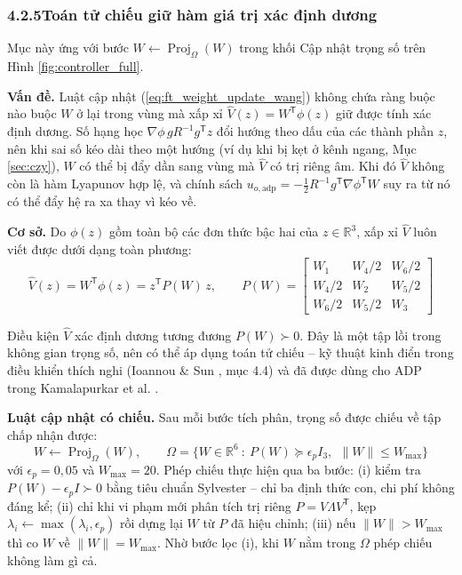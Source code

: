 \documentclass[12pt,a4paper]{article}
\makeatletter
\newcommand{\seclabel}[2]{\phantomsection\protected@edef\@currentlabel{#2}\label{#1}}
\newcommand{\R}{\mathbb{R}}
\newcommand{\T}{\mathsf{T}}
\makeatother
\begin{document}
\subsubsection*{4.2.5\quad Toán tử chiếu giữ hàm giá trị xác định dương}
\seclabel{sec:projection}{4.2.5}

Mục này ứng với bước $W \leftarrow \operatorname{Proj}_\Omega(W)$ trong khối Cập nhật trọng số trên Hình \ref{fig:controller_full}.

\textbf{Vấn đề.} Luật cập nhật (\ref{eq:ft_weight_update_wang}) không chứa ràng buộc nào buộc $W$ ở lại trong vùng mà xấp xỉ $\hat{V}(z) = W^\T\phi(z)$ giữ được tính xác định dương. Số hạng học $\nabla\phi\, g R^{-1} g^\T z$ đổi hướng theo dấu của các thành phần $z$, nên khi sai số kéo dài theo một hướng (ví dụ khi bị kẹt ở kênh ngang, Mục \ref{sec:czy}), $W$ có thể bị đẩy dần sang vùng mà $\hat V$ có trị riêng âm. Khi đó $\hat{V}$ không còn là hàm Lyapunov hợp lệ, và chính sách $u_{o,\text{adp}} = -\frac{1}{2}R^{-1}g^\T\nabla\phi^\T W$ suy ra từ nó có thể đẩy hệ ra xa thay vì kéo về.

\textbf{Cơ sở.} Do $\phi(z)$ gồm toàn bộ các đơn thức bậc hai của $z \in \R^3$, xấp xỉ $\hat V$ luôn viết được dưới dạng toàn phương:
\begin{equation}\label{eq:V_quadratic}
    \hat{V}(z) = W^\T\phi(z) = z^\T P(W)\, z, \qquad
    P(W) = \begin{bmatrix}
        W_1 & W_4/2 & W_6/2 \\
        W_4/2 & W_2 & W_5/2 \\
        W_6/2 & W_5/2 & W_3
    \end{bmatrix}
\end{equation}

Điều kiện $\hat V$ xác định dương tương đương $P(W) \succ 0$. Đây là một tập lồi trong không gian trọng số, nên có thể áp dụng toán tử chiếu -- kỹ thuật kinh điển trong điều khiển thích nghi (Ioannou \& Sun \cite{Ioannou1996}, mục 4.4) và đã được dùng cho ADP trong Kamalapurkar et al. \cite{Kamalapurkar2018}.

\textbf{Luật cập nhật có chiếu.} Sau mỗi bước tích phân, trọng số được chiếu về tập chấp nhận được:
\begin{equation}\label{eq:projection}
    W \leftarrow \operatorname{Proj}_\Omega(W), \qquad
    \Omega = \big\{ W \in \R^6 \ :\ P(W) \succeq \epsilon_p I_3,\ \ \|W\| \leq W_{\max} \big\}
\end{equation}
với $\epsilon_p = 0{,}05$ và $W_{\max} = 20$. Phép chiếu thực hiện qua ba bước: (i) kiểm tra $P(W) - \epsilon_p I \succ 0$ bằng tiêu chuẩn Sylvester -- chỉ ba định thức con, chi phí không đáng kể; (ii) chỉ khi vi phạm mới phân tích trị riêng $P = V\Lambda V^\T$, kẹp $\lambda_i \leftarrow \max(\lambda_i, \epsilon_p)$ rồi dựng lại $W$ từ $P$ đã hiệu chỉnh; (iii) nếu $\|W\| > W_{\max}$ thì co $W$ về $\|W\| = W_{\max}$. Nhờ bước lọc (i), khi $W$ nằm trong $\Omega$ phép chiếu không làm gì cả.
\end{document}
